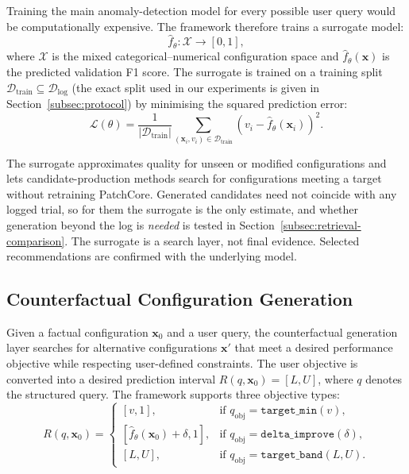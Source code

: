\documentclass[final,5p,times,twocolumn]{elsarticle}
\begin{document}
Training the main anomaly-detection model for every possible user
query would be computationally expensive. The framework therefore
trains a surrogate model:
\begin{equation}
    \hat{f}_{\theta}: \mathcal{X} \rightarrow [0,1],
    \label{eq:surrogate}
\end{equation}
where $\mathcal{X}$ is the mixed categorical--numerical configuration
space and $\hat{f}_{\theta}(\mathbf{x})$ is the predicted validation
F1 score. The surrogate is trained on a training split
$\mathcal{D}_{\mathrm{train}} \subseteq \mathcal{D}_{\mathrm{log}}$ (the
exact split used in our experiments is given in
Section~\ref{subsec:protocol}) by minimising the squared prediction
error:
\begin{equation}
    \mathcal{L}(\theta)
    =
    \frac{1}{|\mathcal{D}_{\mathrm{train}}|}
    \sum_{(\mathbf{x}_i,v_i)\in \mathcal{D}_{\mathrm{train}}}
    \left(v_i - \hat{f}_{\theta}(\mathbf{x}_i)\right)^2.
    \label{eq:surrogate-loss}
\end{equation}

The surrogate approximates quality for unseen or modified
configurations and lets candidate-production methods search for
configurations meeting a target without retraining PatchCore.
Generated candidates need not coincide with any logged trial, so for
them the surrogate is the only estimate, and whether generation beyond
the log is \emph{needed} is tested in
Section~\ref{subsec:retrieval-comparison}. The surrogate is a search
layer, not final evidence. Selected recommendations are confirmed with
the underlying model.

\subsection{Counterfactual Configuration Generation}
\label{subsec:cf-generation}

Given a factual configuration $\mathbf{x}_0$ and a user query, the
counterfactual generation layer searches for alternative configurations
$\mathbf{x}'$ that meet a desired performance objective while
respecting user-defined constraints. The user objective is converted
into a desired prediction interval $R(q, \mathbf{x}_0) = [L, U]$,
where $q$ denotes the structured query. The framework supports three
objective types:
\begin{equation}
R(q,\mathbf{x}_0)=
\begin{cases}
[v, 1], & \text{if } q_{\mathrm{obj}}=\texttt{target\_min}(v), \\
[\hat{f}_{\theta}(\mathbf{x}_0)+\delta, 1],
        & \text{if } q_{\mathrm{obj}}=\texttt{delta\_improve}(\delta), \\
[L, U], & \text{if } q_{\mathrm{obj}}=\texttt{target\_band}(L,U).
\end{cases}
\label{eq:objective-types}
\end{equation}
\end{document}
